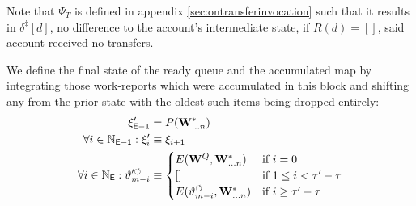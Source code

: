 Note that $\Psi_T$ is defined in appendix \ref{sec:ontransferinvocation} such that it results in $\delta^\ddagger[d]$, \ie no difference to the account's intermediate state, if $R(d) = []$, \ie said account received no transfers.

We define the final state of the ready queue and the accumulated map by integrating those work-reports which were accumulated in this block and shifting any from the prior state with the oldest such items being dropped entirely:
\begin{align}
  \xi'_{\mathsf{E} - 1} &= P(\mathbf{W}^*_{\dots n}) \\
  \forall i \in \mathbb{N}_\mathsf{E - 1}: \xi'_{i} &\equiv \xi_{i + 1} \\
  \forall i \in \mathbb{N}_\mathsf{E} : \vartheta'^\circlearrowleft_{m - i} &\equiv \begin{cases}
    E(\mathbf{W}^Q, \mathbf{W}^*_{\dots n}) &\text{if } i = 0 \\
    [] &\text{if } 1 \le i < \tau' - \tau \\
    E(\vartheta^\circlearrowleft_{m - i}, \mathbf{W}^*_{\dots n}) &\text{if } i \ge \tau' - \tau
  \end{cases}
\end{align}
